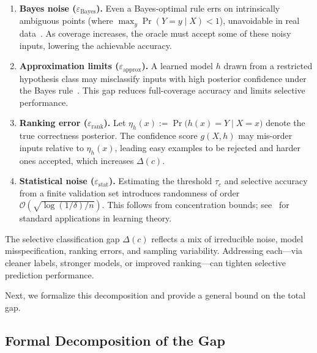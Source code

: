 \begin{enumerate}

\item \textbf{Bayes noise (\(\varepsilon_{\text{Bayes}}\)).}  
  Even a Bayes-optimal rule errs on intrinsically ambiguous points
(where \(\max_y \Pr(Y=y\mid X)<1\)), unavoidable in real data~\citep{devroye2013probabilistic}.  
As coverage increases, the oracle must accept some of these noisy inputs, lowering the achievable accuracy.


\item \textbf{Approximation limits (\(\varepsilon_{\text{approx}}\)).}  
  A learned model \(h\) drawn from a restricted hypothesis class may
  misclassify inputs with high posterior confidence under the Bayes rule~\citep{bishop2006pattern}.  
  This gap reduces full-coverage accuracy and limits selective performance.

\item \textbf{Ranking error (\(\varepsilon_{\text{rank}}\)).}  
  Let \(\eta_h(x):=\Pr\bigl(h(x)=Y\mid X=x\bigr)\) denote the true
  correctness posterior. The confidence score \(g(X,h)\) may
  mis-order inputs relative to \(\eta_h(x)\), leading easy examples
  to be rejected and harder ones accepted, which increases \(\Delta(c)\).  

\item \textbf{Statistical noise (\(\varepsilon_{\text{stat}}\)).}  
  Estimating the threshold \(\tau_c\) and selective accuracy from a finite validation set introduces randomness
  of order \(\mathcal{O}(\sqrt{\log(1/\delta)/n})\). This follows from concentration bounds; see~\citet{shalev2014understanding} for standard applications in learning theory.

\end{enumerate}

\begin{takeaway}
The selective classification gap \(\Delta(c)\) reflects a mix of irreducible noise,
model misspecification, ranking errors, and sampling variability. Addressing each—via cleaner labels,
stronger models, or improved ranking—can tighten selective prediction performance.
\end{takeaway}

Next, we formalize this decomposition and provide a general bound on the total gap.

\subsection{Formal Decomposition of the Gap}
\label{sec:formal-gap}


